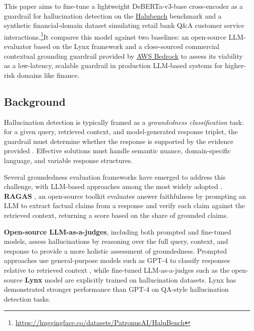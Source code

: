 \documentclass[11pt]{article}
\begin{document}
This paper aims to fine-tune a lightweight DeBERTa-v3-base cross-encoder as a guardrail for hallucination detection on the \href{https://huggingface.co/datasets/PatronusAI/HaluBench}{Halubench} benchmark \citet{ravi2024lynx} and a synthetic financial-domain dataset simulating retail bank Q\&A customer service interactions.\footnote{\url{https://huggingface.co/datasets/PatronusAI/HaluBench}}It compares this model against two baselines: an open-source LLM-evaluator based on the Lynx framework \citet{ravi2024lynx} and a close-sourced commercial contextual grounding guardrail provided by \href{https://docs.aws.amazon.com/bedrock/latest/userguide/guardrails-contextual-grounding-check.html}{AWS Bedrock} to assess its viability as a low-latency, scalable guardrail in production LLM-based systems for higher-risk domains like finance.

\subsection{Background}
Hallucination detection is typically framed as a \textit{groundedness classification} task: for a given query, retrieved context, and model-generated response triplet, the guardrail must determine whether the response is supported by the evidence provided \citep{luo2024hallucination}. Effective solutions must handle semantic nuance, domain-specific language, and variable response structures.

Several groundedness evaluation frameworks have emerged to address this challenge, with LLM-based approaches among the most widely adopted \citep{deng2023survey, luo2024hallucination}. \textbf{RAGAS} \citep{es2023ragas}, an open-source toolkit evaluates answer faithfulness by prompting an LLM to extract factual claims from a response and verify each claim against the retrieved context, returning a score based on the share of grounded claims.

\textbf{Open-source LLM-as-a-judges}, including both prompted and fine-tuned models, assess hallucinations by reasoning over the full query, context, and response to provide a more holistic assessment of groundedness. Prompted approaches use general-purpose models such as GPT-4 to classify responses relative to retrieved context \citep{zheng2023judging, manakul2023selfcheckgpt}, while fine-tuned LLM-as-a-judges such as the open-source \textbf{Lynx} \citep{ravi2024lynx} model are explicitly trained on hallucination datasets. Lynx has demonstrated stronger performance than GPT-4 on QA-style hallucination detection tasks. 
\end{document}
